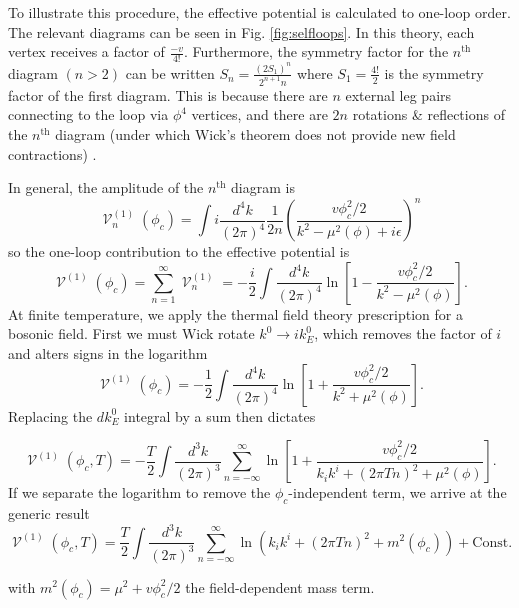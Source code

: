 \documentclass[%
 reprint,
nofootinbib,
 amsmath,amssymb,
 aps,
floatfix,
]{revtex4-1}
\DeclareMathOperator{\V}{\mathcal{V}}
\begin{document}
To illustrate this procedure, the effective potential is calculated to one-loop order.
The relevant diagrams can be seen in Fig. \ref{fig:selfloops}.
In this theory, each vertex receives a factor of $\frac{-v}{4!}$.
Furthermore, the symmetry factor for the $n^\text{th}$ diagram $(n>2)$ can be written $S_n = \frac{(2S_1)^n}{2^{n+1}n}$ where $S_1=\frac{4!}{2}$ is the symmetry factor of the first diagram.
This is because there are $n$ external leg pairs connecting to the loop via $\phi^4$ vertices, and there are $2n$ rotations \& reflections of the $n^\text{th}$ diagram (under which Wick's theorem does not provide new field contractions) \cite{quiros99}.

In general, the amplitude of the $n^\text{th}$ diagram is
\begin{equation}
    \V_n^{(1)}(\phi_c) = \int i\frac{d^4k}{(2\pi)^4} \frac{1}{2n} \left(\frac{v\phi_c^2/2}{k^2-\mu^2(\phi)+i\epsilon}\right)^n
\end{equation}
so the one-loop contribution to the effective potential is
\begin{equation}
    \V^{(1)}(\phi_c) = \sum_{n=1}^\infty \V_n^{(1)} = -\frac{i}{2} \int \frac{d^4k}{(2\pi)^4} \ln \left[1- \frac{v\phi_c^2/2}{k^2-\mu^2(\phi)}\right].
\end{equation}
At finite temperature, we apply the thermal field theory prescription for a bosonic field. First we must Wick rotate $k^0\rightarrow ik_E^0$, which removes the factor of $i$ and alters signs in the logarithm
\begin{equation}
    \V^{(1)}(\phi_c) = -\frac{1}{2} \int \frac{d^4k}{(2\pi)^4} \ln \left[1+ \frac{v\phi_c^2/2}{k^2+\mu^2(\phi)}\right].
\end{equation}
Replacing the $dk^0_E$ integral by a sum then dictates
\begin{widetext}
\begin{equation}
    \V^{(1)}(\phi_c, T) = -\frac{T}{2} \int \frac{d^3k}{(2\pi)^3} \sum_{n=-\infty}^{\infty} \ln \left[1+ \frac{v\phi_c^2/2}{k_ik^i+(2\pi T n)^2 + \mu^2(\phi)}\right].
\end{equation}
If we separate the logarithm to remove the $\phi_c$-independent term, we arrive at the generic result \cite{sher89}
\begin{equation}
    \V^{(1)}(\phi_c, T) = \frac{T}{2} \int \frac{d^3k}{(2\pi)^3} \sum_{n=-\infty}^{\infty} \ln \left(k_ik^i+(2\pi T n)^2 + m^2(\phi_c)\right) + \text{Const}.
\end{equation}
\end{widetext}
with $m^2(\phi_c) = \mu^2+v\phi_c^2/2$ the field-dependent mass term.
\end{document}
